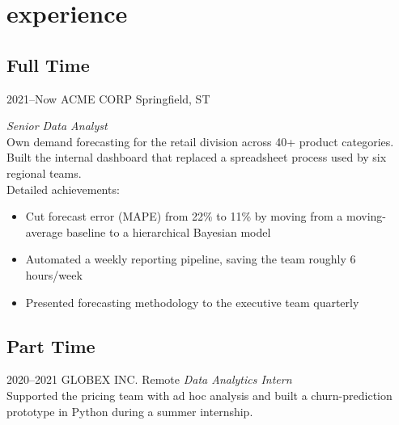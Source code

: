\documentclass[]{friggeri-cv-a4}
\begin{document}

\section{experience}

\subsection{Full Time}

\begin{entrylist}


\entry
{2021--Now}
{ACME CORP}
{Springfield, ST}
{\emph{Senior Data Analyst} \\
Own demand forecasting for the retail division across 40+ product categories. Built the internal dashboard that replaced a spreadsheet process used by six regional teams. \\
Detailed achievements:
\begin{itemize}
\item Cut forecast error (MAPE) from 22\% to 11\% by moving from a moving-average baseline to a hierarchical Bayesian model
\item Automated a weekly reporting pipeline, saving the team roughly 6 hours/week
\item Presented forecasting methodology to the executive team quarterly
\end{itemize}}


\end{entrylist}

\subsection{Part Time}

\begin{entrylist}

\entry
{2020--2021}
{GLOBEX INC.}
{Remote}
{\emph{Data Analytics Intern} \\
Supported the pricing team with ad hoc analysis and built a churn-prediction prototype in Python during a summer internship.}


\end{entrylist}
\end{document}
